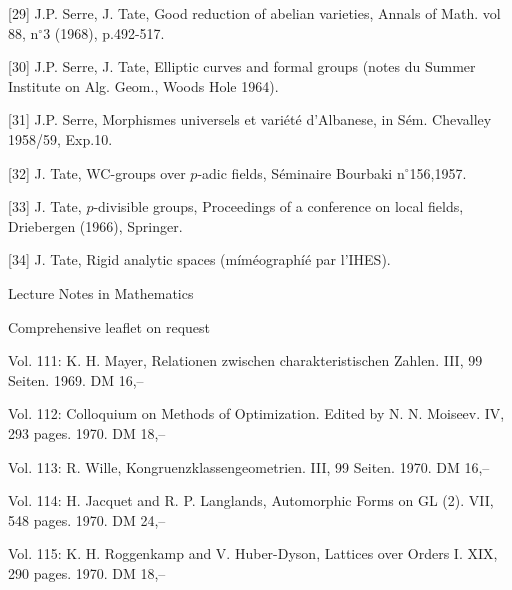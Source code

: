 {[29]} J.P. Serre, J. Tate, Good reduction of abelian varieties, Annals of Math. vol 88, n$^{\circ}$3 (1968), p.492-517.

{[30]} J.P. Serre, J. Tate, Elliptic curves and formal groups (notes du Summer Institute on Alg. Geom., Woods Hole 1964).

{[31]} J.P. Serre, Morphismes universels et variété d'Albanese, in Sém. Chevalley 1958/59, Exp.10.

{[32]} J. Tate, WC-groups over $p$-adic fields, Séminaire Bourbaki n$^{\circ}$156,1957.

{[33]} J. Tate, $p$-divisible groups, Proceedings of a conference on local fields, Driebergen (1966), Springer.

{[34]} J. Tate, Rigid analytic spaces (míméographíé par l'IHES).







Lecture Notes in Mathematics


Comprehensive leaflet on request

Vol. 111: K. H. Mayer, Relationen zwischen charakteristischen Zahlen. III, 99 Seiten. 1969. DM 16,--

Vol. 112: Colloquium on Methods of Optimization. Edited by N. N. Moiseev. IV, 293 pages. 1970. DM 18,--

Vol. 113: R. Wille, Kongruenzklassengeometrien. III, 99 Seiten. 1970. DM 16,--

Vol. 114: H. Jacquet and R. P. Langlands, Automorphic Forms on GL (2). VII, 548 pages. 1970. DM 24,--

Vol. 115: K. H. Roggenkamp and V. Huber-Dyson, Lattices over Orders I. XIX, 290 pages. 1970. DM 18,--

